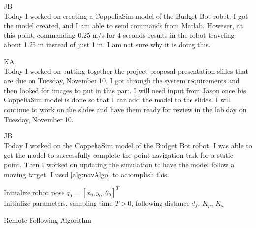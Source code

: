 \documentclass[fontsize=11pt, %
                             paper=letter, %
                             openany, %
                             captions=tableheading,
                             index=totoc,
                             hyperref]{labbook}
\begin{document}
\begin{addmargin}[0cm]{0cm}


JB\\
Today I worked on creating a CoppeliaSim model of the Budget Bot robot. I got the model created, and I am able to send commands from Matlab. However, at this point, commanding 0.25 m/s for 4 seconds results in the robot traveling about 1.25 m instead of just 1 m. I am not sure why it is doing this.

\vspace*{12pt}
KA\\
Today I worked on putting together the project proposal presentation slides that are due on Tuesday, November 10. I got through the system requirements and then looked for images to put in this part. I will need input from Jason once his CoppeliaSim model is done so that I can add the model to the slides. I will continue to work on the slides and have them ready for review in the lab day on Tuesday, November 10. 



JB\\
Today I worked on the CoppeliaSim model of the Budget Bot robot. I was able to get the model to successfully complete the point navigation task for a static point. Then I worked on updating the simulation to have the model follow a moving target. I used \autoref{alg:navAlgo} to accomplish this.

\begin{algorithm}[h!]
    \SetAlgoLined
    \Begin
    {
        Initialize robot pose $q_0 = [x_0, y_0, \theta_0]^T$\\
        Initialize parameters, sampling time $T > 0$, following distance $d_f$, $K_p$, $K_\omega$\\
    }
    \caption{Remote Following Algorithm}
    \label{alg:navAlgo}
  \end{algorithm}


\end{addmargin}
\end{document}
